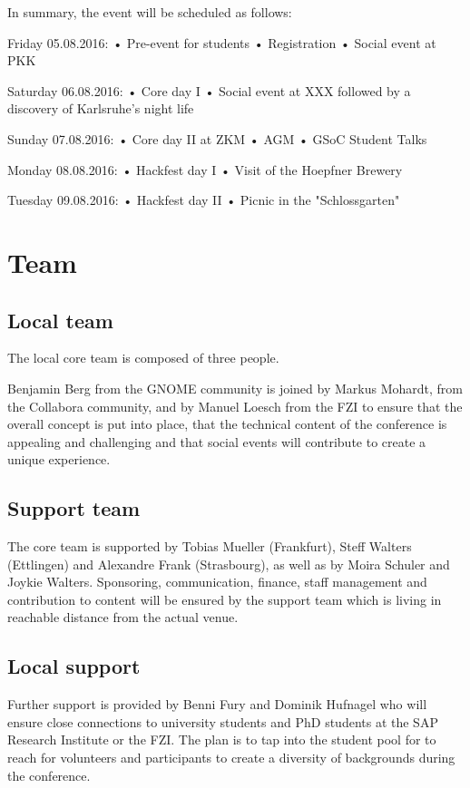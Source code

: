 In summary, the event will be scheduled as follows:

Friday 05.08.2016: 
• Pre-event for students
• Registration
• Social event at PKK 

Saturday 06.08.2016:
• Core day I
• Social event at XXX followed by a discovery of Karlsruhe's night life

Sunday 07.08.2016:
• Core day II at ZKM
• AGM
• GSoC Student Talks

Monday 08.08.2016:
• Hackfest day I
• Visit of the Hoepfner Brewery 

Tuesday 09.08.2016:
• Hackfest day II
• Picnic in the "Schlossgarten" 


\section{Team}

\subsection{Local team}
The local core team is composed of three people.

Benjamin Berg from the GNOME community is joined by Markus Mohardt, from the Collabora community, and by Manuel Loesch from the FZI to ensure that the overall concept is put into place, that the technical content of the conference is appealing and challenging and that social events will contribute to create a unique experience.

\subsection{Support team}

The core team is supported by Tobias Mueller (Frankfurt), Steff Walters (Ettlingen) and Alexandre Frank (Strasbourg), as well as by Moira Schuler and Joykie Walters. Sponsoring, communication, finance, staff management and contribution to content will be ensured by the support team which is living in reachable distance from the actual venue. 

\subsection{Local support}

Further support is provided by Benni Fury and Dominik Hufnagel who will ensure close connections to university students and PhD students at the SAP Research Institute or the FZI. The plan is to tap into the student pool for to reach for volunteers and participants to create a diversity of backgrounds during the conference. 

